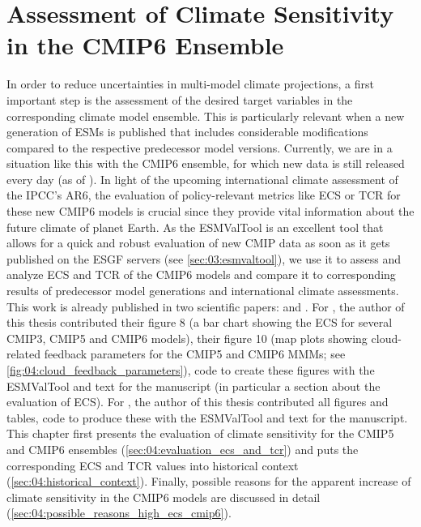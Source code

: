 


\chapter{Assessment of Climate Sensitivity in the \acs{CMIP}6 Ensemble}
\label{ch:04:papers_ecs_tcr_assessment}

In order to reduce uncertainties in multi-model climate projections, a first
important step is the assessment of the desired target variables in the
corresponding climate model ensemble. This is particularly relevant when a new
generation of \acp{ESM} is published that includes considerable modifications
compared to the respective predecessor model versions. Currently, we are in a
situation like this with the \acs{CMIP}6 ensemble, for which new data is still
released every day (as of \TheMonth{}). In light of the upcoming international
climate assessment of the \ac{IPCC}'s \acs{AR}6, the evaluation of
policy-relevant metrics like \ac{ECS} or \ac{TCR} for these new \acs{CMIP}6
models is crucial since they provide vital information about the future climate
of planet Earth. As the \ac{ESMValTool} is an excellent tool that allows for a
quick and robust evaluation of new \ac{CMIP} data as soon as it gets published
on the \ac{ESGF} servers (see \cref{sec:03:esmvaltool}), we use it to assess
and analyze \ac{ECS} and \ac{TCR} of the \acs{CMIP}6 models and compare it to
corresponding results of predecessor model generations and international
climate assessments. This work is already published in two scientific papers:
\textcite{Bock2020} and \textcite{Meehl2020}. For \textcite{Bock2020}, the
author of this thesis contributed their figure 8 (a bar chart showing the
\ac{ECS} for several \acs{CMIP}3, \acs{CMIP}5 and \acs{CMIP}6 models), their
figure 10 (map plots showing cloud-related feedback parameters for the
\acs{CMIP}5 and \acs{CMIP}6 \acp{MMM}; see
\cref{fig:04:cloud_feedback_parameters}), code to create these figures with the
\ac{ESMValTool} and text for the manuscript (in particular a section about the
evaluation of \ac{ECS}). For \textcite{Meehl2020}, the author of this thesis
contributed all figures and tables, code to produce these with the
\ac{ESMValTool} and text for the manuscript. This chapter first presents the
evaluation of climate sensitivity for the \acs{CMIP}5 and \acs{CMIP}6 ensembles
(\cref{sec:04:evaluation_ecs_and_tcr}) and puts the corresponding \ac{ECS} and
\ac{TCR} values into historical context (\cref{sec:04:historical_context}).
Finally, possible reasons for the apparent increase of climate sensitivity in
the \acs{CMIP}6 models are discussed in detail
(\cref{sec:04:possible_reasons_high_ecs_cmip6}).


